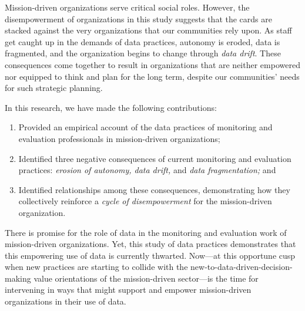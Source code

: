 Mission-driven organizations serve critical social roles. However, the disempowerment of organizations in this study suggests that the cards are stacked against the very organizations that our communities rely upon. As staff get caught up in the demands of data practices, autonomy is eroded, data is fragmented, and the organization begins to change through \textit{data drift}. These consequences come together to result in organizations that are neither empowered nor equipped to think and plan for the long term, despite our communities’ needs for such strategic planning.

In this research, we have made the following contributions:
\begin{enumerate}
	\item Provided an empirical account of the data practices of monitoring and evaluation professionals in mission-driven organizations;
	\item Identified three negative consequences of current monitoring and evaluation practices: \textit{erosion of autonomy, data drift,} and \textit{data fragmentation;} and
	\item Identified relationships among these consequences, demonstrating how they collectively reinforce a \textit{cycle of disempowerment} for the mission-driven organization.
\end{enumerate}

There is promise for the role of data in the monitoring and evaluation work of mission-driven organizations. Yet, this study of data practices demonstrates that this empowering use of data is currently thwarted. Now—at this opportune cusp when new practices are starting to collide with the new-to-data-driven-decision-making value orientations of the mission-driven sector—is the time for intervening in ways that might support and empower mission-driven organizations in their use of data.






















